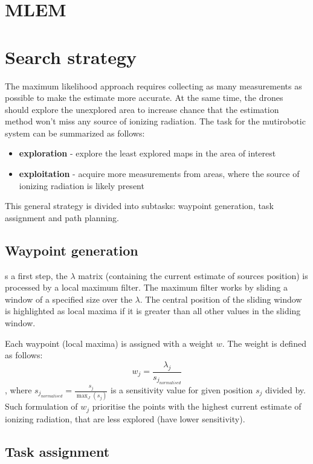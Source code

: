 \section{MLEM}

\section{Search strategy}
The maximum likelihood approach requires collecting as many measurements as possible to make the estimate more accurate.
At the same time, the drones should explore the unexplored area to increase chance that the estimation method won't miss any source of ionizing radiation.
The task for the mutirobotic system can be summarized as follows:
\begin{itemize}
  \item \textbf{exploration} - explore the least explored maps in the area of interest
  \item \textbf{exploitation} - acquire more measurements from areas, where the source of ionizing radiation is likely present
\end{itemize}
 
This general strategy is divided into subtasks: waypoint generation, task assignment and path planning.
\subsection{Waypoint generation}
s a first step, the $\lambda$ matrix (containing the current estimate of sources position) is processed by a local maximum filter. 
The maximum filter works by sliding a window of a specified size over the $\lambda$.
The central position of the sliding window is highlighted as local maxima if it is greater than all other values in the sliding window.

Each waypoint (local maxima) is assigned with a weight $w$.
The weight is defined as follows:
\begin{equation}
  w_{j} = \frac{\lambda_{j}}{s_{j_{normalised}}}
\end{equation},
where $s_{j_{normalised}} = \frac{s_{j}}{\max_{J}( s_{j})}$ is a sensitivity value for given position $s_{j}$ divided by.
Such formulation of $w_{j}$ prioritise the points with the highest current estimate of ionizing radiation, that are less explored (have lower sensitivity).

\subsection{Task assignment}

